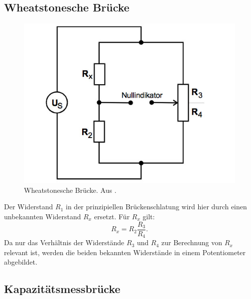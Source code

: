 \subsection{Wheatstonesche Brücke}
\begin{figure}
  \centering
  \includegraphics[scale=0.5]{content/wheatstone.jpg}
  \caption{Wheatstonesche Brücke. Aus \cite{anleitung302}.}
  \label{fig:wheatstone}
\end{figure}

Der Widerstand $R_{1}$ in der prinzipiellen Brückenschlatung wird hier durch einen unbekannten Widerstand $R_x$ ersetzt. Für $R_x$ gilt:
\begin{equation}
  R_x = R_{2} \frac{R_3}{R_4}.
\end{equation}
Da nur das Verhältnis der Widerstände $R_3$ und $R_4$ zur Berechnung von $R_x$ relevant ist, werden die beiden bekannten Widerstände in einem Potentiometer abgebildet.

\subsection{Kapazitätsmessbrücke}

